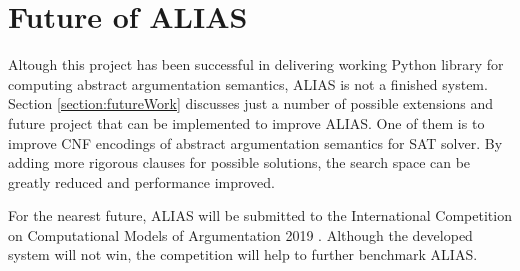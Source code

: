 \section{Future of ALIAS}
Altough this project has been successful in delivering working Python library for computing abstract argumentation semantics, ALIAS is not a finished system. Section \ref{section:futureWork} discusses just a number of possible extensions and future project that can be implemented to improve ALIAS. One of them is to improve CNF encodings of abstract argumentation semantics for SAT solver. By adding more rigorous clauses for possible solutions, the search space can be greatly reduced and performance improved.

For the nearest future, ALIAS will be submitted to the International Competition on Computational Models of Argumentation 2019 \cite{ICCMA2019}. Although the developed system will not win, the competition will help to further benchmark ALIAS.  